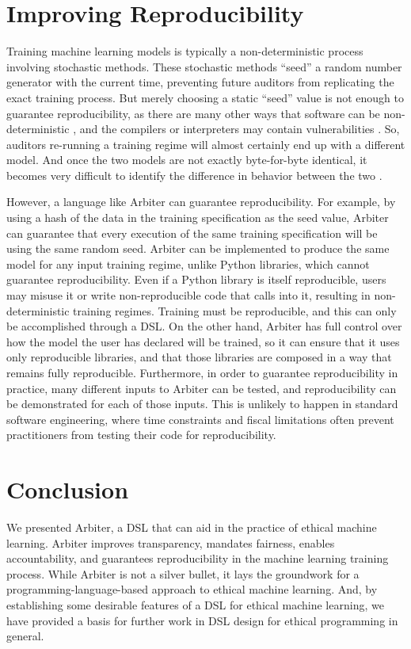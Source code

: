 \documentclass[letterpaper]{article}
\newcommand{\citep}[1]{\cite{#1}}
\begin{document}
\section{Improving Reproducibility}
Training machine learning models is typically a non-deterministic process involving stochastic methods. These stochastic methods ``seed'' a random number generator with the current time, preventing future auditors from replicating the exact training process. But merely choosing a static ``seed'' value is not enough to guarantee reproducibility, as there are many other ways that software can be non-deterministic \citep{Maste2017}, and the compilers or interpreters may contain vulnerabilities \citep{Thompson1984}. So, auditors re-running a training regime will almost certainly end up with a different model. And once the two models are not exactly byte-for-byte identical, it becomes very difficult to identify the difference in behavior between the two \citep{Perry2014}.

However, a language like Arbiter can guarantee reproducibility. For example, by using a hash of the data in the training specification as the seed value, Arbiter can guarantee that every execution of the same training specification will be using the same random seed. Arbiter can be implemented to produce the same model for any input training regime, unlike Python libraries, which cannot guarantee reproducibility. Even if a Python library is itself reproducible, users may misuse it or write non-reproducible code that calls into it, resulting in non-deterministic training regimes. Training must be reproducible, and this can only be accomplished through a DSL. On the other hand, Arbiter has full control over how the model the user has declared will be trained, so it can ensure that it uses only reproducible libraries, and that those libraries are composed in a way that remains fully reproducible. Furthermore, in order to guarantee reproducibility in practice, many different inputs to Arbiter can be tested, and reproducibility can be demonstrated for each of those inputs. This is unlikely to happen in standard software engineering, where time constraints and fiscal limitations often prevent practitioners from testing their code for reproducibility.

\section{Conclusion}
We presented Arbiter, a DSL that can aid in the practice of ethical machine learning. Arbiter improves transparency, mandates fairness, enables accountability, and guarantees reproducibility in the machine learning training process. While Arbiter is not a silver bullet, it lays the groundwork for a programming-language-based approach to ethical machine learning. And, by establishing some desirable features of a DSL for ethical machine learning, we have provided a basis for further work in DSL design for ethical programming in general. 



\end{document}
